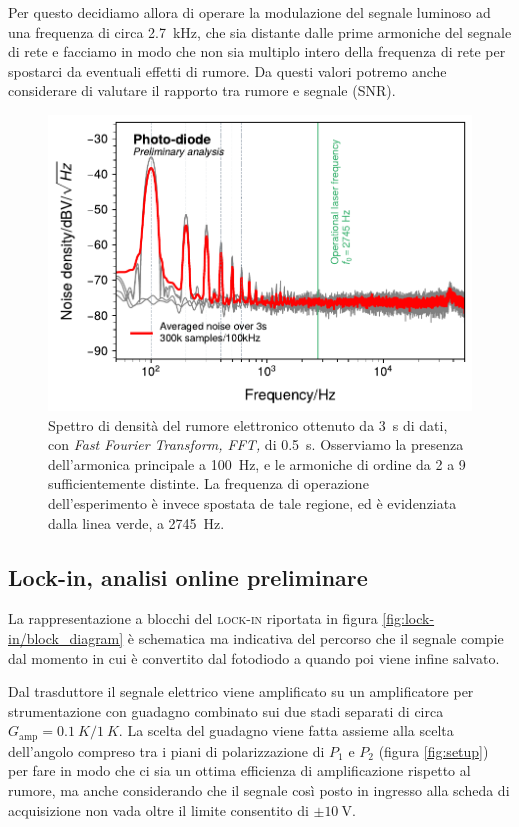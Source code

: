 \documentclass[
    prb,altaffilletter,citeautoscript,
    amsmath,amssymb,
    showpacs,showkeys,floatfix,
    reprint
]{revtex4-1}
\begin{document}
Per questo decidiamo allora di operare la modulazione del segnale luminoso ad una frequenza di circa \SI{2.7}{\kilo\hertz}, che sia distante dalle prime armoniche del segnale di rete e facciamo in modo che non sia multiplo intero della frequenza di rete per spostarci da eventuali effetti di rumore. Da questi valori potremo anche considerare di valutare il rapporto tra rumore e segnale (SNR). 

\begin{figure}
    \centering
    \includegraphics[width=\linewidth]{figures/noise_nds.pdf}
    \caption{Spettro di densità\cite{welchUseFastFourier1967a} del rumore elettronico ottenuto da \SI{3}{\second} di dati, con \emph{Fast Fourier Transform, FFT,} di \SI{0.5}{\second}. Osserviamo la presenza dell'armonica principale a \SI{100}{\hertz}, e le armoniche di ordine da 2 a 9 sufficientemente distinte. La frequenza di operazione dell'esperimento è invece spostata de tale regione, ed è evidenziata dalla linea verde, a \SI{2745}{\hertz}.}
    \label{fig:NDS}
\end{figure}

\subsection{Lock-in, analisi online preliminare}

La rappresentazione a blocchi del \textsc{lock-in}\cite{scofieldFrequencydomainDescriptionLockin1994} riportata in figura \ref{fig:lock-in/block_diagram} è schematica ma indicativa del percorso che il segnale compie dal momento in cui è convertito dal fotodiodo a quando poi viene infine salvato. 

Dal trasduttore il segnale elettrico viene amplificato su un amplificatore per strumentazione con guadagno combinato sui due stadi separati di circa $G_\mathrm{amp}=\SI{0.1}{K}/\SI{1}{K}$. La scelta del guadagno viene fatta assieme alla scelta dell'angolo compreso tra i piani di polarizzazione di $P_1$ e $P_2$ (figura \ref{fig:setup}) per fare in modo che ci sia un ottima efficienza di amplificazione rispetto al rumore, ma anche considerando che il segnale così posto in ingresso alla scheda di acquisizione non vada oltre il limite consentito di $\pm\SI{10}{\volt}$. 
\end{document}

